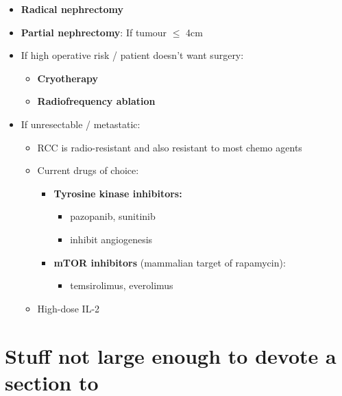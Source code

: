 \documentclass[
  12pt,
]{memoir}
\providecommand{\tightlist}{%
  \setlength{\itemsep}{0pt}\setlength{\parskip}{0pt}}
\begin{document}
\begin{itemize}
\tightlist
\item
  \textbf{Radical nephrectomy}
\item
  \textbf{Partial nephrectomy}: If tumour \(\le\) 4cm
\item
  If high operative risk / patient doesn't want surgery:

  \begin{itemize}
  \tightlist
  \item
    \textbf{Cryotherapy}
  \item
    \textbf{Radiofrequency ablation}
  \end{itemize}
\item
  If unresectable / metastatic:

  \begin{itemize}
  \tightlist
  \item
    RCC is radio-resistant and also resistant to most chemo agents
  \item
    Current drugs of choice:

    \begin{itemize}
    \tightlist
    \item
      \textbf{Tyrosine kinase inhibitors:}

      \begin{itemize}
      \tightlist
      \item
        pazopanib, sunitinib
      \item
        inhibit angiogenesis
      \end{itemize}
    \item
      \textbf{mTOR inhibitors} (mammalian target of rapamycin):

      \begin{itemize}
      \tightlist
      \item
        temsirolimus, everolimus
      \end{itemize}
    \end{itemize}
  \item
    High-dose IL-2
  \end{itemize}
\end{itemize}

\pagebreak

\hypertarget{stuff-not-large-enough-to-devote-a-section-to-1}{%
\section{Stuff not large enough to devote a section
to}\label{stuff-not-large-enough-to-devote-a-section-to-1}}
\end{document}
